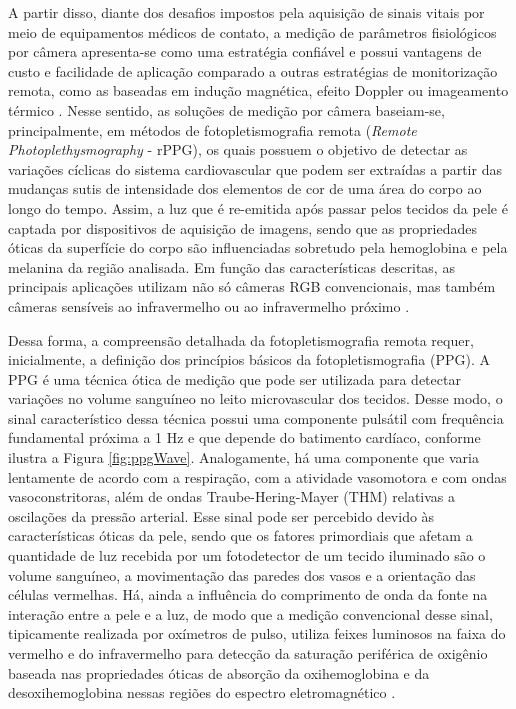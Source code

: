 A partir disso, diante dos desafios impostos pela aquisição de sinais vitais por meio de equipamentos médicos de contato, a medição de parâmetros fisiológicos por câmera apresenta-se como uma estratégia confiável e possui vantagens de custo e facilidade de aplicação comparado a outras estratégias de monitorização remota, como as baseadas em indução magnética, efeito Doppler ou imageamento térmico \cite{khanam2019clinicalnonclinicalReview}. Nesse sentido, as soluções de medição por câmera baseiam-se, principalmente, em métodos de fotopletismografia remota (\textit{Remote Photoplethysmography} - rPPG), os quais possuem o objetivo de detectar as variações cíclicas do sistema cardiovascular que podem ser extraídas a partir das mudanças sutis de intensidade dos elementos de cor de uma área do corpo ao longo do tempo. Assim, a luz que é re-emitida após passar pelos tecidos da pele é captada por dispositivos de aquisição de imagens, sendo que as propriedades óticas da superfície do corpo são influenciadas sobretudo pela hemoglobina e pela melanina da região analisada. Em função das características descritas, as principais aplicações utilizam não só câmeras RGB convencionais, mas também câmeras sensíveis ao infravermelho ou ao infravermelho próximo \cite{selvaraju2022continuous}.

Dessa forma, a compreensão detalhada da fotopletismografia remota requer, inicialmente, a definição dos princípios básicos da fotopletismografia (PPG). A PPG é uma técnica ótica de medição que pode ser utilizada para detectar variações no volume sanguíneo no leito microvascular dos tecidos. Desse modo, o sinal característico dessa técnica possui uma componente pulsátil com frequência fundamental próxima a 1 Hz e que depende do batimento cardíaco, conforme ilustra a Figura \ref{fig:ppgWave}. Analogamente, há uma componente que varia lentamente de acordo com a respiração, com a atividade vasomotora e com ondas vasoconstritoras, além de ondas Traube-Hering-Mayer (THM) relativas a oscilações da pressão arterial. Esse sinal pode ser percebido devido às características óticas da pele, sendo que os fatores primordiais que afetam a quantidade de luz recebida por um fotodetector de um tecido iluminado são o volume sanguíneo, a movimentação das paredes dos vasos e a orientação das células vermelhas. Há, ainda a influência do comprimento de onda da fonte na interação entre a pele e a luz, de modo que a medição convencional desse sinal, tipicamente realizada por oxímetros de pulso, utiliza feixes luminosos na faixa do vermelho e do infravermelho para detecção da saturação periférica de oxigênio baseada nas propriedades óticas de absorção da oxihemoglobina e da desoxihemoglobina nessas regiões do espectro eletromagnético \cite{allen2007photoplethysmography}.

